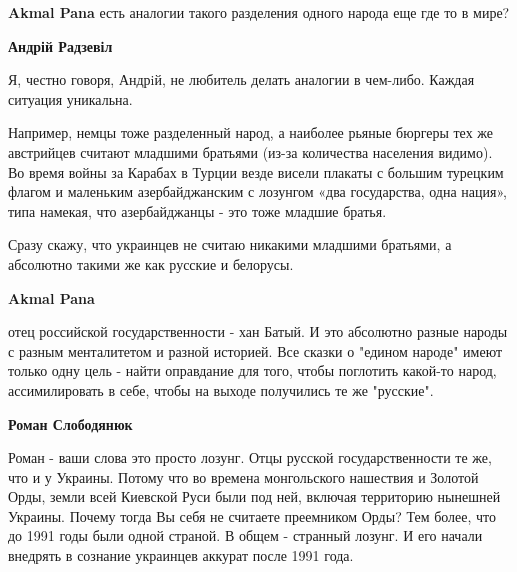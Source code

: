 \begin{itemize}
\begin{itemize}
\textbf{Akmal Pana} есть аналогии такого разделения одного народа еще где то в мире?

 
\textbf{Андрій Радзевіл} 

Я, честно говоря, Андрiй, не любитель делать аналогии в чем-либо. Каждая
ситуация уникальна.

Например, немцы тоже разделенный народ, а наиболее рьяные бюргеры тех же
австрийцев считают младшими братьями (из-за количества населения видимо). Во
время войны за Карабах в Турции везде висели плакаты с большим турецким флагом
и маленьким азербайджанским с лозунгом «два государства, одна нация», типа
намекая, что азербайджанцы - это тоже младшие братья.

Сразу скажу, что украинцев не считаю никакими младшими братьями, а абсолютно
такими же как русские и белорусы.

 
\textbf{Akmal Pana} 

отец российской государственности - хан Батый. И это абсолютно разные народы с
разным менталитетом и разной историей. Все сказки о "едином народе" имеют
только одну цель - найти оправдание для того, чтобы поглотить какой-то народ,
ассимилировать в себе, чтобы на выходе получились те же "русские".

 
\textbf{Роман Слободянюк} 

Роман - ваши слова это просто лозунг. Отцы русской государственности те же, что
и у Украины. Потому что во времена монгольского нашествия и Золотой Орды, земли
всей Киевской Руси были под ней, включая территорию нынешней Украины. Почему
тогда Вы себя не считаете преемником Орды? Тем более, что до 1991 годы были
одной страной. В общем - странный лозунг. И его начали внедрять в сознание
украинцев аккурат после 1991 года.


\end{itemize}
\end{itemize}
